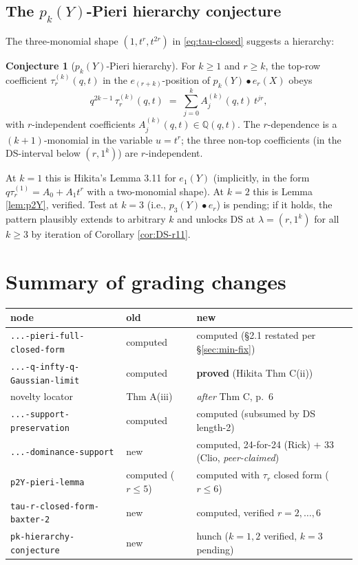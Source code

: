 \documentclass[11pt]{article}
\theoremstyle{definition}
\newtheorem{conjecture}[theorem]{Conjecture}
\begin{document}
\subsection*{The $p_k(Y)$-Pieri hierarchy conjecture}
The three-monomial shape $(1,t^r,t^{2r})$ in \eqref{eq:tau-closed}
suggests a hierarchy:

\begin{conjecture}[$p_k(Y)$-Pieri hierarchy]\label{conj:pk-hierarchy}
For $k\ge 1$ and $r\ge k$, the top-row coefficient
$\tau_r^{(k)}(q,t)$ in the $e_{(r+k)}$-position of
$p_k(Y)\bullet e_r(X)$ obeys
\begin{equation}\label{eq:pk-hierarchy}
  q^{2k-1}\, \tau_r^{(k)}(q,t)
    \;=\; \sum_{j=0}^{k} A_j^{(k)}(q,t)\, t^{jr},
\end{equation}
with $r$-independent coefficients $A_j^{(k)}(q,t)\in\mathbb Q(q,t)$.
The $r$-dependence is a $(k+1)$-monomial in the variable $u=t^r$;
the three non-top coefficients (in the DS-interval below $(r,1^k)$)
are $r$-independent.
\end{conjecture}

At $k=1$ this is Hikita's Lemma 3.11 for $e_1(Y)$ (implicitly, in
the form $q\tau_r^{(1)} = A_0 + A_1 t^r$ with a two-monomial shape).
At $k=2$ this is Lemma \ref{lem:p2Y}, verified. Test at $k=3$
(i.e., $p_3(Y)\bullet e_r$) is pending; if it holds, the pattern
plausibly extends to arbitrary $k$ and unlocks DS at
$\lambda=(r,1^k)$ for all $k\ge 3$ by iteration of
Corollary \ref{cor:DS-r11}.

\section*{Summary of grading changes}
\begin{center}\small
\begin{tabular}{lll}
node & old & new \\ \hline
\verb|...-pieri-full-closed-form|      & computed & computed (\S 2.1 restated per \S \ref{sec:min-fix}) \\
\verb|...-q-infty-q-Gaussian-limit|    & computed & \textbf{proved} (Hikita Thm C(ii)) \\
novelty locator                        & Thm A(iii) & \emph{after} Thm C, p.~6 \\
\verb|...-support-preservation|        & computed & computed (subsumed by DS length-2) \\
\verb|...-dominance-support|           & new      & computed, 24-for-24 (Rick) + 33 (Clio, \emph{peer-claimed}) \\
\verb|p2Y-pieri-lemma|                 & computed ($r\le 5$) & computed with $\tau_r$ closed form ($r\le 6$) \\
\verb|tau-r-closed-form-baxter-2|      & new      & computed, verified $r=2,\dots,6$ \\
\verb|pk-hierarchy-conjecture|         & new      & hunch ($k=1,2$ verified, $k=3$ pending) \\
\end{tabular}
\end{center}
\end{document}
